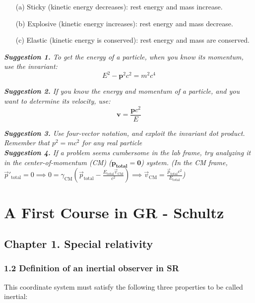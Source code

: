 \documentclass[12pt]{book}
\begin{document}
            \begin{enumerate}
                \item[(a)] Sticky (kinetic energy decreases): rest energy and mass increase.
                \item[(b)] Explosive (kinetic energy increases): rest energy and mass decrease.
                \item[(c)] Elastic (kinetic energy is conserved): rest energy and mass are conserved.
            \end{enumerate}
            
        
        \textit{\textbf{Suggestion 1.} To get the energy of a particle, when you know its momentum, use the invariant:}
        \[
            E^2-\bm{p}^2c^2=m^2c^4    
        \] 
        
        \textit{\textbf{Suggestion 2.} If you know the energy and momentum of a particle, and you want to determine its velocity, use:}
        \[
            \bm{v}=\frac{\bm{p}c^2}{E}
        \]
        
        \textit{\textbf{Suggestion 3.} Use four-vector notation, and exploit the invariant dot product. Remember that \(p^2=mc^2\) for any real particle}\\
        
        \textit{\textbf{Suggestion 4.} If a problem seems cumbersome in the lab frame, try analyzing it in the center-of-momentum (CM) (\(\bm{p_{total}=0}\)) system. (In the CM frame, \( \vec{p}'_{\text{total}} = 0 \implies 0 = \gamma_{\text{CM}} \left( \vec{p}_{\text{total}} - \frac{E_{\text{total}} \vec{v}_{\text{CM}}}{c^2} \right) \implies \vec{v}_{\text{CM}} = \frac{\vec{p}_{\text{total}} c^2}{E_{\text{total}}} \))}

\chapter{A First Course in GR - Schultz}

\section{Chapter 1. Special relativity}
    \subsection{1.2 Definition of an inertial observer in SR}
        This coordinate system must satisfy the following three properties to be called inertial:
\end{document}
